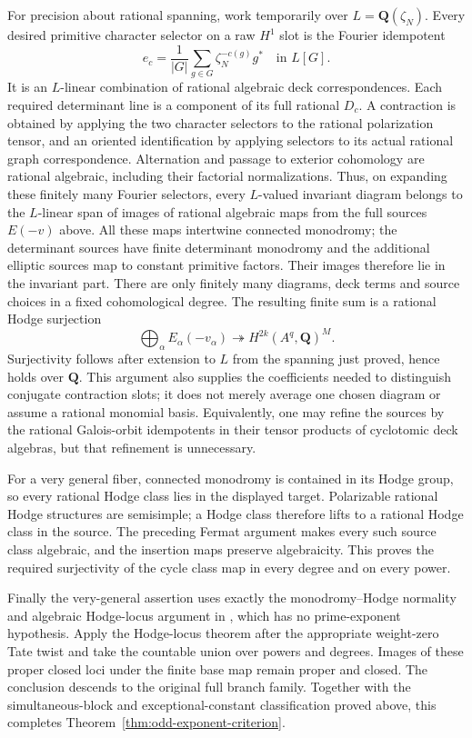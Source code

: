 \documentclass[11pt]{article}
\theoremstyle{definition}
\newcommand{\Q}{\mathbf Q}
\begin{document}
For precision about rational spanning, work temporarily over
$L=\Q(\zeta_N)$. Every desired primitive character selector on a raw
$H^1$ slot is the Fourier idempotent
\[
 e_c=\frac1{|G|}\sum_{g\in G}\zeta_N^{-c(g)}g^*
 \quad\text{in }L[G].
\]
It is an $L$-linear combination of rational algebraic deck
correspondences. Each required determinant line is a component of its
full rational $D_c$. A contraction is obtained by applying the two
character selectors to the rational polarization tensor, and an
oriented identification by applying selectors to its actual rational
graph correspondence. Alternation and passage to exterior cohomology
are rational algebraic, including their factorial normalizations.
Thus, on expanding these finitely many Fourier selectors, every
$L$-valued invariant diagram belongs to the $L$-linear span of images
of rational algebraic maps from the full sources $E(-v)$ above.
All these maps intertwine connected monodromy; the determinant sources
have finite determinant monodromy and the additional elliptic sources
map to constant primitive factors. Their images therefore lie in the
invariant part.
There are only finitely many diagrams, deck terms and source choices
in a fixed cohomological degree. The resulting finite sum is a rational
Hodge surjection
\[
 \bigoplus_\alpha E_\alpha(-v_\alpha)
    \twoheadrightarrow H^{2k}(A^q,\Q)^M.
\]
Surjectivity follows after extension to $L$ from the spanning just
proved, hence holds over $\Q$. This argument also supplies the
coefficients needed to distinguish conjugate contraction slots; it does
not merely average one chosen diagram or assume a rational monomial
basis. Equivalently, one may refine the sources by the rational
Galois-orbit idempotents in their tensor products of cyclotomic deck
algebras, but that refinement is unnecessary.

For a very general fiber, connected monodromy is contained in its
Hodge group, so every rational Hodge class lies in the displayed target.
Polarizable rational Hodge structures are semisimple; a Hodge class
therefore lifts to a rational Hodge class in the source. The preceding
Fermat argument makes every such source class algebraic, and the
insertion maps preserve algebraicity. This proves the required
surjectivity of the cycle class map in every degree and on every power.

Finally the very-general assertion uses exactly the monodromy--Hodge
normality and algebraic Hodge-locus argument in \cite[Section 6]{General},
which has no prime-exponent hypothesis. Apply the Hodge-locus theorem
after the appropriate weight-zero Tate twist and take the countable
union over powers and degrees. Images of these proper closed loci under
the finite base map remain proper and closed. The conclusion descends
to the original full branch family. Together with the simultaneous-block
and exceptional-constant classification proved above, this completes
Theorem~\ref{thm:odd-exponent-criterion}.
\end{document}
